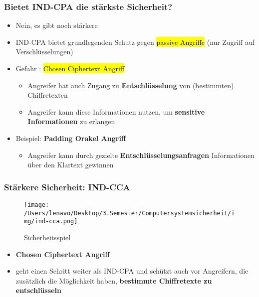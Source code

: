 \documentclass[a4paper, 10pt]{article}
\begin{document}
\subsubsection{Bietet IND-CPA die stärkste Sicherheit?}
\begin{itemize}
    \item Nein, es gibt noch stärkere
    \item IND-CPA bietet grundlegenden Schutz gegen \hl{passive Angriffe} (nur Zugriff auf Verschlüsselungen)
    \item Gefahr : \hl{Chosen Ciphertext Angriff}
    \begin{itemize}
        \item Angreifer hat auch Zugang zu \textbf{Entschlüsselung} von (bestimmten) Chiffretexten
        \item Angreifer kann diese Informationen nutzen, um \textbf{sensitive Informationen} zu erlangen
    \end{itemize}

    \item Beispiel: \textbf{Padding Orakel Angriff}
    \begin{itemize}
        \item Angreifer kann durch gezielte \textbf{Entschlüsselungsanfragen} Informationen über den Klartext gewinnen
    \end{itemize}
\end{itemize}

\subsubsection{Stärkere Sicherheit: IND-CCA}
\begin{figure}[h]
    \centering
    \texttt{[image: /Users/lenavo/Desktop/3.Semester/Computersystemsicherheit/img/ind-cca.png]}
    \caption{Sicherheitsspiel}
    \label{fig:enter-label}
\end{figure}
\begin{itemize}
    \item \textbf{Chosen Ciphertext Angriff}
    \item geht einen Schritt weiter als IND-CPA und schützt auch vor Angreifern, die zusätzlich die Möglichkeit haben, \textbf{bestimmte Chiffretexte zu entschlüsseln}
\end{itemize}
\end{document}
